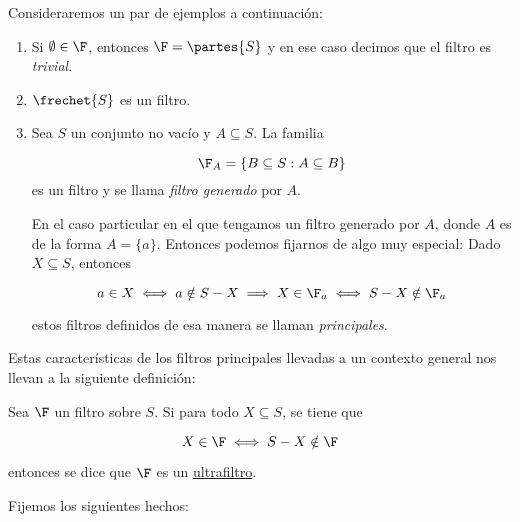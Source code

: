 \begin{ejem}
    Consideraremos un par de ejemplos a continuación:
    
    \begin{enumerate}
        \item Si $\emptyset \in \F$, entonces $\F = \partes{S}$ y en ese caso decimos que el filtro es \textit{trivial}.
        \item $\frechet{S}$ es un filtro.
        \item Sea $S$ un conjunto no vacío y $A \subseteq S$. La familia
        
        \[
        \F_{A} = \{ B \subseteq S : A \subseteq B \}
        \]
        \noindent es un filtro y se llama \textit{filtro generado} por $A$.
        
        En el caso particular en el que tengamos un filtro generado por $A$, donde $A$ es de la forma $A = \{a\}$. Entonces podemos fijarnos de algo muy especial: Dado $X \subseteq S$, entonces
        
        \[
            a \in X \iff a \notin S - X \implies X \in \F_a \iff S - X \notin \F_a
        \]
        
        \noindent estos filtros definidos de esa manera se llaman \textit{principales}.
    \end{enumerate}
\end{ejem}

Estas características de los filtros principales llevadas a un contexto general nos llevan a la siguiente definición:

\begin{defn}
    Sea $\F$ un filtro sobre $S$. Si para todo $X \subseteq S$, se tiene que
    
    \[
    X \in \F \iff S - X \notin \F
    \]
    
    \noindent entonces se dice que $\F$ es un \ul{ultrafiltro}.
\end{defn}

Fijemos los siguientes hechos:

